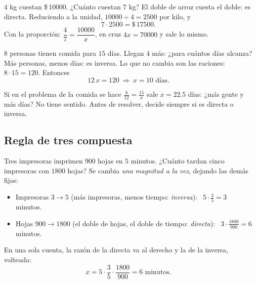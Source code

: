 \documentclass[11pt,a4paper]{article}
\let\nivelzuka\nivel
\renewcommand{\nivel}[2]{\Needspace{8\baselineskip}\nivelzuka{#1}{#2}}
\newcommand{\pesos}[1]{\$\,\num{#1}}
\begin{document}
\begin{minipage}[t]{0.49\linewidth}
\begin{ejemplo}
$4$ kg cuestan \pesos{10000}. ¿Cuánto cuestan $7$ kg? El doble de arroz cuesta el doble: es directa.
Reduciendo a la unidad, $\num{10000}\div4=\num{2500}$ por kilo, y
\[ 7\cdot2500=\pesos{17500}. \]
Con la proporción: $\dfrac47=\dfrac{\num{10000}}{x}$, en cruz $4x=\num{70000}$ y sale lo mismo.
\end{ejemplo}
\end{minipage}\hfill
\begin{minipage}[t]{0.49\linewidth}
\begin{ejemplo}
$8$ personas tienen comida para $15$ días. Llegan $4$ más: ¿para cuántos días alcanza? Más personas, menos días: es inversa.
Lo que no cambia son las raciones: $8\cdot15=120$. Entonces
\[ 12\,x=120\ \Longrightarrow\ x=10\text{ días}. \]
\end{ejemplo}
\end{minipage}
\begin{ojo}
Si en el problema de la comida se hace $\tfrac{8}{12}=\tfrac{15}{x}$ sale $x=22.5$ días: ¿más gente y más días? No tiene
sentido. Antes de resolver, decide siempre si es directa o inversa.
\end{ojo}

\subsection{Regla de tres compuesta}
Tres impresoras imprimen $900$ hojas en $5$ minutos. ¿Cuánto tardan cinco impresoras con $\num{1800}$ hojas? Se cambia
\emph{una magnitud a la vez}, dejando las demás fijas:
\begin{itemize}
\item Impresoras $3\to5$ (más impresoras, menos tiempo: \emph{inversa}): \ $5\cdot\tfrac35=3$ minutos.
\item Hojas $900\to\num{1800}$ (el doble de hojas, el doble de tiempo: \emph{directa}): \ $3\cdot\tfrac{1800}{900}=6$ minutos.
\end{itemize}
En una sola cuenta, la razón de la directa va al derecho y la de la inversa, volteada:
\[ x=5\cdot\frac35\cdot\frac{1800}{900}=6\text{ minutos}. \]

\end{document}
